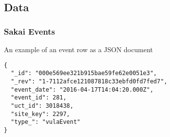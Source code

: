 \subsection{Data}
\label{appendix:data}
\subsubsection{Sakai Events}
\label{appendix:sakai-events}
\begin{table}[]
  \centering
  \label{event-data-csv}
  \caption{Sakai event data}
\end{table}

An example of an event row as a JSON document
\begin{verbatim}
{
  "_id": "000e569ee321b915bae59fe62e0051e3",
  "_rev": "1-7112afce121087818c33ebfd0fd7fed7",
  "event_date": "2016-04-17T14:04:20.000Z",
  "event_id": 281,
  "uct_id": 3018438,
  "site_key": 2297,
  "type_": "vulaEvent"
}
\end{verbatim}

